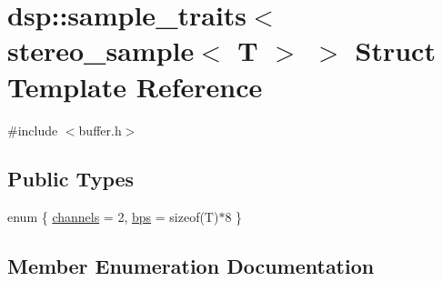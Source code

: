 \hypertarget{structdsp_1_1sample__traits_3_01stereo__sample_3_01_t_01_4_01_4}{}\section{dsp\+:\+:sample\+\_\+traits$<$ stereo\+\_\+sample$<$ T $>$ $>$ Struct Template Reference}
\label{structdsp_1_1sample__traits_3_01stereo__sample_3_01_t_01_4_01_4}


{\ttfamily \#include $<$buffer.\+h$>$}

\subsection*{Public Types}
\begin{DoxyCompactItemize}
\item 
enum \{ \hyperlink{structdsp_1_1sample__traits_3_01stereo__sample_3_01_t_01_4_01_4_a169d0791c5961ed65fa69bf8b4afb143ae461a0132d158ac4e90d19bbae513187}{channels} = 2, 
\hyperlink{structdsp_1_1sample__traits_3_01stereo__sample_3_01_t_01_4_01_4_a169d0791c5961ed65fa69bf8b4afb143a3a5d7d0c99ecbf37fc8fe76b118f6681}{bps} = sizeof(T)$\ast$8
 \}
\end{DoxyCompactItemize}


\subsection{Member Enumeration Documentation}

